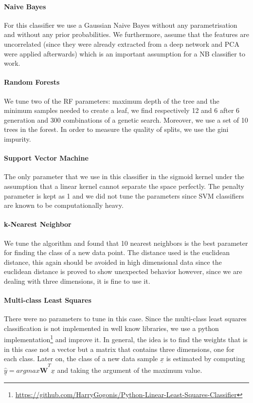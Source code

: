 \documentclass{article}
\begin{document}
\paragraph{Naive Bayes}
For this classifier we use a Gaussian Naive Bayes without any parametrisation and without any prior probabilities. We furthermore, assume that the features are uncorrelated (since they were already extracted from a deep network and PCA were applied afterwards) which is an important assumption for a NB classifier to work.

\paragraph{Random Forests}
We tune two of the RF parameters: maximum depth of the tree and the minimum samples needed to create a leaf, we find respectively 12 and 6 after 6 generation and 300 combinations of a genetic search. Moreover, we use a set of 10 trees in the forest. In order to measure the quality of splits, we use the gini impurity.

\paragraph{Support Vector Machine}
The only parameter that we use in this classifier in the sigmoid kernel under the assumption that a linear kernel cannot separate the space perfectly. The penalty parameter is kept as 1 and we did not tune the parameters since SVM classifiers are known to be computationally heavy.

\paragraph{k-Nearest Neighbor}
We tune the algorithm and found that 10 nearest neighbors is the best parameter for finding the class of a new data point. The distance used is the euclidean distance, this again should be avoided in high dimensional data since the euclidean distance is proved to show unexpected behavior however, since we are dealing with three dimensions, it is fine to use it.

\paragraph{Multi-class Least Squares}
There were no parameters to tune in this case. 
Since the multi-class least squares classification is not implemented in well know libraries, we use a python implementation\footnote{\url{https://github.com/HarryGogonis/Python-Linear-Least-Squares-Classifier}} and improve it. In general, the idea is to find the weights that is in this case not a vector but a matrix that contains three dimensions, one for each class. Later on, the class of a new data sample $\underline{x}$ is estimated by computing $\widehat{\underline{y}} = argmax \widehat{\textbf{W}}^{T}\underline{x}$ and taking the argument of the maximum value.
\end{document}
